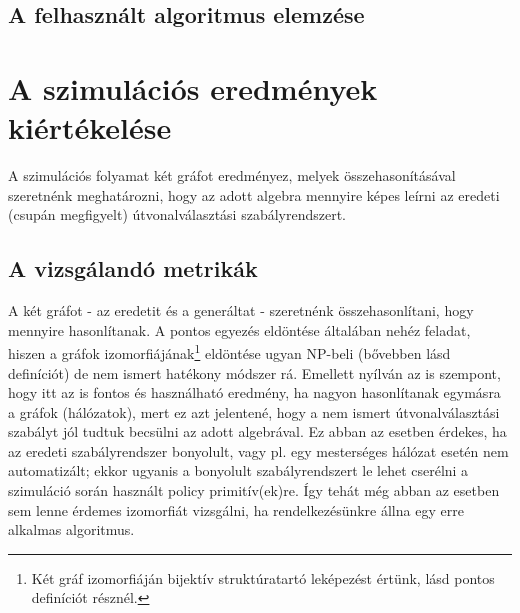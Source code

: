     \subsection{A felhasznált algoritmus elemzése}

                \todo

  \section{A szimulációs eredmények kiértékelése}
  A szimulációs folyamat két gráfot eredményez, melyek összehasonításával szeretnénk meghatározni, hogy az adott algebra mennyire képes leírni az eredeti (csupán megfigyelt) útvonalválasztási szabályrendszert.


    \subsection{A vizsgálandó metrikák}
    A két gráfot - az eredetit és a generáltat - szeretnénk összehasonlítani, hogy mennyire hasonlítanak. A pontos egyezés eldöntése általában nehéz feladat, hiszen a gráfok izomorfiájának\footnote{Két gráf izomorfiáján bijektív struktúratartó leképezést értünk, lásd pontos definíciót  résznél.} eldöntése ugyan NP-beli (bővebben lásd  definíciót) de nem ismert hatékony módszer rá. Emellett nyílván az is szempont, hogy itt az is fontos és használható eredmény, ha nagyon hasonlítanak egymásra a gráfok (hálózatok), mert ez azt jelentené, hogy a nem ismert útvonalválasztási szabályt jól tudtuk becsülni az adott algebrával. Ez abban az esetben érdekes, ha az eredeti szabályrendszer bonyolult, vagy pl. egy mesterséges hálózat esetén nem automatizált; ekkor ugyanis a bonyolult szabályrendszert le lehet cserélni a szimuláció során használt policy primitív(ek)re. Így tehát még abban az esetben sem lenne érdemes izomorfiát vizsgálni, ha rendelkezésünkre állna egy erre alkalmas algoritmus.\\

